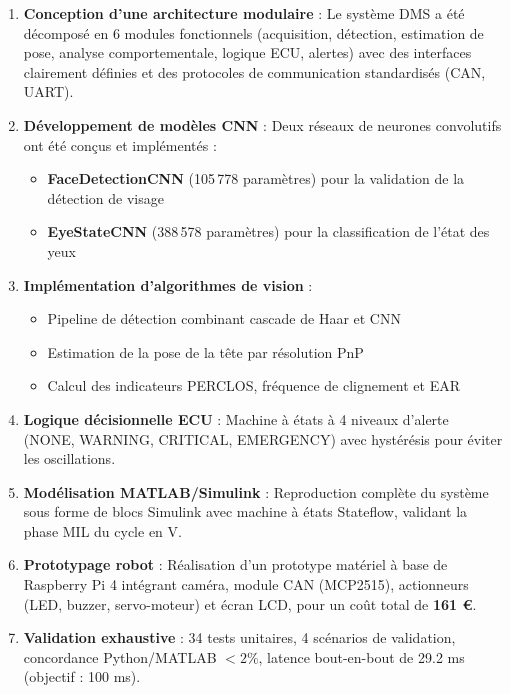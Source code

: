 \documentclass[12pt,a4paper,twoside]{report}
\begin{document}
\begin{enumerate}[leftmargin=2cm]
    \item \textbf{Conception d'une architecture modulaire} : Le système DMS a été décomposé en 6 modules fonctionnels (acquisition, détection, estimation de pose, analyse comportementale, logique ECU, alertes) avec des interfaces clairement définies et des protocoles de communication standardisés (CAN, UART).
    
    \item \textbf{Développement de modèles CNN} : Deux réseaux de neurones convolutifs ont été conçus et implémentés :
    \begin{itemize}
        \item \textbf{FaceDetectionCNN} (105\,778 paramètres) pour la validation de la détection de visage
        \item \textbf{EyeStateCNN} (388\,578 paramètres) pour la classification de l'état des yeux
    \end{itemize}
    
    \item \textbf{Implémentation d'algorithmes de vision} :
    \begin{itemize}
        \item Pipeline de détection combinant cascade de Haar et CNN
        \item Estimation de la pose de la tête par résolution PnP
        \item Calcul des indicateurs PERCLOS, fréquence de clignement et EAR
    \end{itemize}
    
    \item \textbf{Logique décisionnelle ECU} : Machine à états à 4 niveaux d'alerte (NONE, WARNING, CRITICAL, EMERGENCY) avec hystérésis pour éviter les oscillations.
    
    \item \textbf{Modélisation MATLAB/Simulink} : Reproduction complète du système sous forme de blocs Simulink avec machine à états Stateflow, validant la phase MIL du cycle en V.
    
    \item \textbf{Prototypage robot} : Réalisation d'un prototype matériel à base de Raspberry Pi 4 intégrant caméra, module CAN (MCP2515), actionneurs (LED, buzzer, servo-moteur) et écran LCD, pour un coût total de \textbf{161 €}.
    
    \item \textbf{Validation exhaustive} : 34 tests unitaires, 4 scénarios de validation, concordance Python/MATLAB $< 2\%$, latence bout-en-bout de 29.2 ms (objectif : 100 ms).
\end{enumerate}
\end{document}

